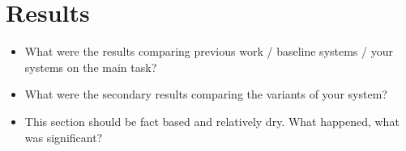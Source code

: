 \documentclass[10pt]{article}
\begin{document}
\section{Results}

\begin{itemize}
\item What were the results comparing previous work / baseline systems / your
systems on the main task?
\item What were the secondary results comparing the variants of your system?
\item This section should be fact based and relatively dry. What happened, what
was significant?
\end{itemize}

\end{document}
